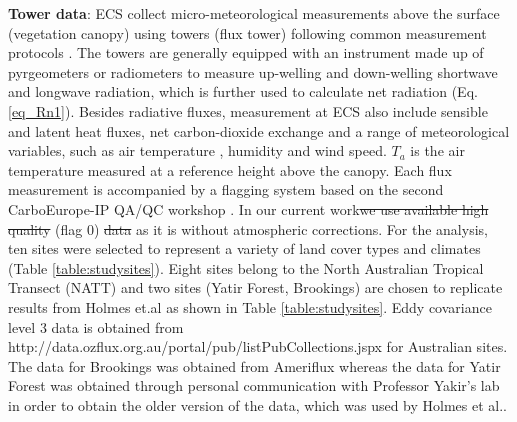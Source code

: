 \documentclass[fleqn,10pt]{wlscirep}
\providecommand{\DIFaddtex}[1]{{\protect\color{blue}\uwave{#1}}} %
\providecommand{\DIFdeltex}[1]{{\protect\color{red}\sout{#1}}}                      %
\providecommand{\DIFaddbegin}{} %
\providecommand{\DIFaddend}{} %
\providecommand{\DIFdelbegin}{} %
\providecommand{\DIFdelend}{} %
\providecommand{\DIFadd}[1]{\texorpdfstring{\DIFaddtex{#1}}{#1}} %
\providecommand{\DIFdel}[1]{\texorpdfstring{\DIFdeltex{#1}}{}} %
\begin{document}
 \textbf{Tower data}:
ECS collect micro-meteorological measurements above the surface (vegetation canopy) using towers (flux tower) following common measurement protocols \cite{baldocchi2001fluxnet}. The towers are generally equipped with an instrument made up of pyrgeometers or radiometers to measure up-welling and down-welling shortwave and longwave radiation, which is further used to calculate net radiation (Eq. \ref{eq_Rn1}). Besides radiative fluxes, measurement at ECS also include sensible and latent heat fluxes, net carbon-dioxide exchange and a range of meteorological variables, such as air temperature \DIFaddbegin \DIFadd{($T_{a}$)}\DIFaddend , humidity and wind speed. $T_{a}$ is the air temperature measured at a reference height above the canopy. Each flux measurement is accompanied by a flagging system based on the second CarboEurope-IP QA/QC workshop \cite{gilberto2020fluxnet2015}. In our current work\DIFdelbegin \DIFdel{we use available high quality }\DIFdelend \DIFaddbegin \DIFadd{, we use high quality available data }\DIFaddend (flag 0) \DIFdelbegin \DIFdel{data }\DIFdelend as it is without atmospheric corrections. For the analysis, ten sites were selected to represent a variety of land cover types and climates (Table \ref{table:studysites}). Eight sites belong to the North Australian Tropical Transect (NATT) and two sites (Yatir Forest, Brookings) are chosen to replicate results from Holmes et.al\cite{holmes2009land} as shown in Table \ref{table:studysites}. Eddy covariance level 3 data is obtained from http://data.ozflux.org.au/portal/pub/listPubCollections.jspx for Australian sites. The data for Brookings was obtained from Ameriflux whereas the data for Yatir Forest was obtained through personal communication with Professor Yakir's lab in order to obtain the older version of the data, which was used by Holmes et al.\cite{holmes2009land}.
\end{document}
